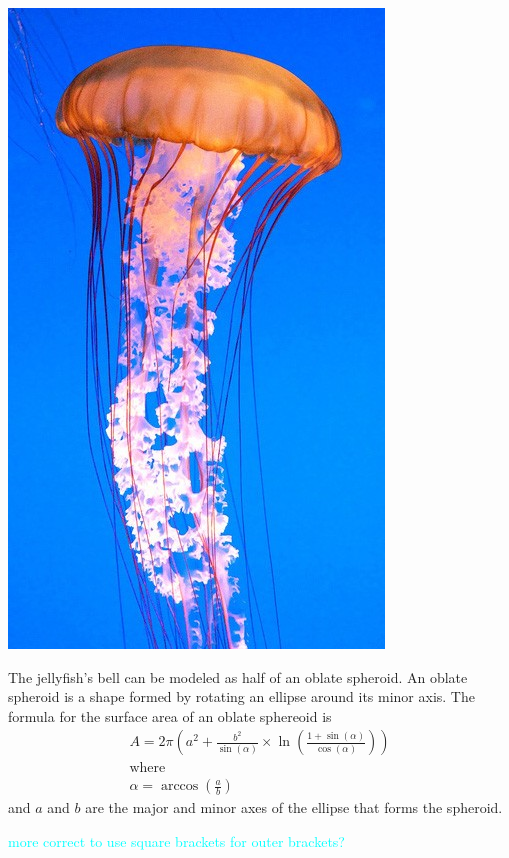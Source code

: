 \documentclass[fleqn]{article}
\newcommand\ask[1]{\textcolor{cyan}{#1}}
\begin{document}
\includegraphics{chrysaora-fuscescens.jpg}

The jellyfish's bell can be modeled as half of an oblate spheroid. An oblate spheroid is a shape formed by rotating an ellipse around its minor axis. The formula for the surface area of an oblate sphereoid is
\begin{gather}
  A = 2\pi\left(a^2+\frac{b^2}{\sin(\alpha)}\times\ln\left(\frac{1+\sin(\alpha)}{\cos(\alpha)}\right)\right) \\
  \text{where} \nonumber \\
  \alpha=\arccos\left(\frac{a}{b}\right) \nonumber
\end{gather}
and $a$ and $b$ are the major and minor axes of the ellipse that forms the spheroid. 

\ask{more correct to use square brackets for outer brackets?}
\end{document}
